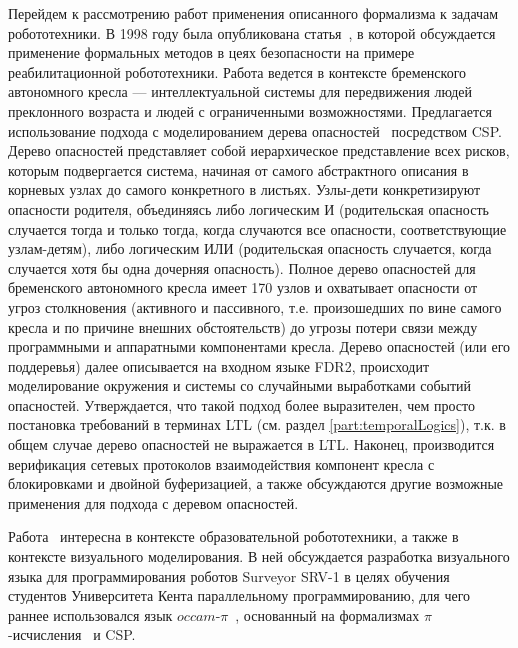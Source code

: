 \documentclass[a4, 14pt]{article}
\begin{document}
Перейдем к рассмотрению работ применения описанного формализма к задачам 
робототехники. В 1998 году была опубликована статья~\cite{lankenau1999formal}, 
в которой обсуждается применение формальных методов в цеях безопасности на 
примере реабилитационной робототехники. Работа ведется в контексте бременского 
автономного кресла --- интеллектуальной системы для передвижения людей преклонного 
возраста и людей с ограниченными возможностями. Предлагается использование 
подхода с моделированием дерева опасностей~\cite{vesely1981fault, hansen1996linking} 
посредством CSP. Дерево опасностей представляет собой иерархическое представление 
всех рисков, которым подвергается система, начиная от самого абстрактного описания 
в корневых узлах до самого конкретного в листьях. Узлы-дети конкретизируют опасности 
родителя, объединяясь либо логическим И (родительская опасность случается тогда 
и только тогда, когда случаются все опасности, соответствующие узлам-детям), 
либо логическим ИЛИ (родительская опасность случается, когда случается хотя бы 
одна дочерняя опасность). Полное дерево опасностей для 
бременского автономного кресла имеет 170 узлов и охватывает опасности от угроз 
столкновения (активного и пассивного, т.е. произошедших по вине самого кресла 
и по причине внешних обстоятельств) до угрозы потери связи между программными 
и аппаратными компонентами кресла. Дерево опасностей (или его поддеревья) далее 
описывается на входном языке FDR2, происходит моделирование окружения и системы 
со случайными выработками событий опасностей. Утверждается, что такой подход 
более выразителен, чем просто постановка требований в терминах LTL (см. раздел 
\ref{part:temporalLogics}), т.к. в общем случае дерево опасностей не выражается 
в LTL. Наконец, производится верификация сетевых протоколов взаимодействия 
компонент кресла с блокировками и двойной буферизацией, а также обсуждаются 
другие возможные применения для подхода с деревом опасностей.

Работа~\cite{simpson2008visual} интересна в контексте образовательной 
робототехники, а также в контексте визуального моделирования. В ней обсуждается 
разработка визуального языка для программирования роботов Surveyor SRV-1
в целях обучения студентов Университета Кента параллельному программированию, 
для чего раннее использовался язык $occam\mbox{-}\pi$~\cite{welch2005communicating}, 
основанный на формализмах $\pi$-исчисления~\cite{welch2005communicating} и CSP.
\end{document}
